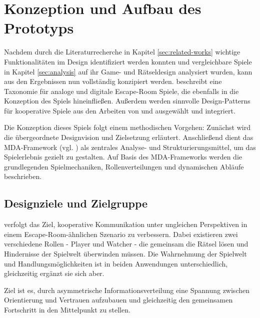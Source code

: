 \chapter{Konzeption und Aufbau des Prototyps}

Nachdem durch die Literaturrecherche in Kapitel \ref{sec:related-works} wichtige Funktionalitäten im Design identifiziert werden konnten und vergleichbare Spiele in Kapitel \ref{sec:analysis} auf ihr Game- und Rätseldesign analysiert wurden, kann aus den Ergebnissen  nun vollständig konzipiert werden. \cite{krekhov_puzzles_2021} beschreibt eine Taxonomie für analoge und digitale Escape-Room Spiele, die ebenfalls in die Konzeption des Spiels hineinfließen. Außerdem werden sinnvolle Design-Patterns für kooperative Spiele aus den Arbeiten von \cite{guimaraes_rocha_game_2008} und \cite{seif_el-nasr_understanding_2010} ausgewählt und integriert.

Die Konzeption dieses Spiels folgt einem methodischen Vorgehen: Zunächst wird die übergeordnete Designvision und Zielsetzung erläutert. Anschließend dient das \ac{MDA}-Framework (vgl. \cite{hunicke_mda_2004}) als zentrales Analyse- und Strukturierungsmittel, um das Spielerlebnis gezielt zu gestalten. Auf Basis des \ac{MDA}-Frameworks werden die grundlegenden Spielmechaniken, Rollenverteilungen und dynamischen Abläufe beschrieben.

\section{Designziele und Zielgruppe}
 verfolgt das Ziel, kooperative Kommunikation unter ungleichen Perspektiven in einem Escape-Room-ähnlichen Szenario zu verbessern. Dabei existieren zwei verschiedene Rollen - Player und Watcher - die gemeinsam die Rätsel lösen und Hindernisse der Spielwelt überwinden müssen. Die Wahrnehmung der Spielwelt und Handlungsmöglichkeiten ist in beiden Anwendungen unterschiedlich, gleichzeitig ergänzt sie sich aber. 

Ziel ist es, durch asymmetrische Informationsverteilung eine Spannung zwischen Orientierung und Vertrauen aufzubauen und gleichzeitig den gemeinsamen Fortschritt in den Mittelpunkt zu stellen.

